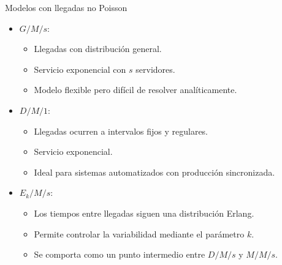 \documentclass{beamer}
\begin{document}
\begin{frame}{Modelos con llegadas no Poisson}
  \begin{itemize}
    \item \textbf{\( G/M/s \)}: \pause
    \begin{itemize}
      \item Llegadas con distribución general. \pause
      \item Servicio exponencial con \( s \) servidores. \pause
      \item Modelo flexible pero difícil de resolver analíticamente. \pause
    \end{itemize}

    \item \textbf{\( D/M/1 \)}: \pause
    \begin{itemize}
      \item Llegadas ocurren a intervalos fijos y regulares. \pause
      \item Servicio exponencial. \pause
      \item Ideal para sistemas automatizados con producción sincronizada. \pause
    \end{itemize}

    \item \textbf{\( E_k/M/s \)}: \pause
    \begin{itemize}
      \item Los tiempos entre llegadas siguen una distribución Erlang. \pause
      \item Permite controlar la variabilidad mediante el parámetro \( k \). \pause
      \item Se comporta como un punto intermedio entre \( D/M/s \) y \( M/M/s \).
    \end{itemize}
  \end{itemize}
\end{frame}

\end{document}
